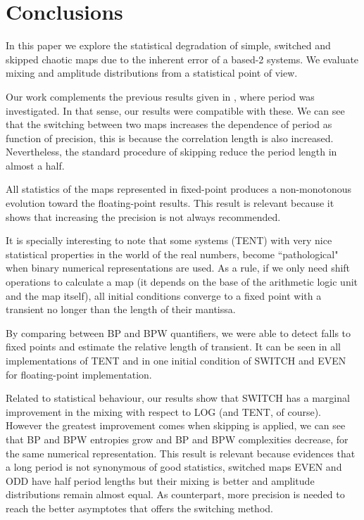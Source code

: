 \section{Conclusions}\label{sec:conclusions}
In this paper we explore the statistical degradation of simple, switched and skipped chaotic maps due to the inherent error of a based-2 systems.
We evaluate mixing and amplitude distributions from a statistical point of view.

Our work complements the previous results given in \cite{Nagaraj2008}, where period was investigated.
In that sense, our results were compatible with these.
We can see that the switching between two maps increases the dependence of period as function of precision, this is because the correlation length is also increased.
Nevertheless, the standard procedure of skipping reduce the period length in almost a half.

All statistics of the maps represented in fixed-point produces a non-monotonous evolution toward the floating-point results.
This result is relevant because it shows that increasing the precision is not always recommended.

It is specially interesting to note that some systems (TENT) with very nice statistical properties in the world of the real numbers, become ``pathological" when binary numerical representations are used.
As a rule, if we only need shift operations to calculate a map (it depends on the base of the arithmetic logic unit and the map itself), all initial conditions converge to a fixed point with a transient no longer than the length of their mantissa.

By comparing between BP and BPW quantifiers, we were able to detect falls to fixed points and estimate the relative length of transient. It can be seen in all implementations of TENT and in one initial condition of SWITCH and EVEN for floating-point implementation.

Related to statistical behaviour, our results show that SWITCH has a marginal improvement in the mixing with respect to LOG (and TENT, of course).
However the greatest improvement comes when skipping is applied, we can see that BP and BPW entropies grow and BP and BPW complexities decrease, for the same numerical representation.
This result is relevant because evidences that a long period is not synonymous of good statistics, switched maps EVEN and ODD have half period lengths but their mixing is better and amplitude distributions remain almost equal.
As counterpart, more precision is needed to reach the better asymptotes that offers the switching method.
